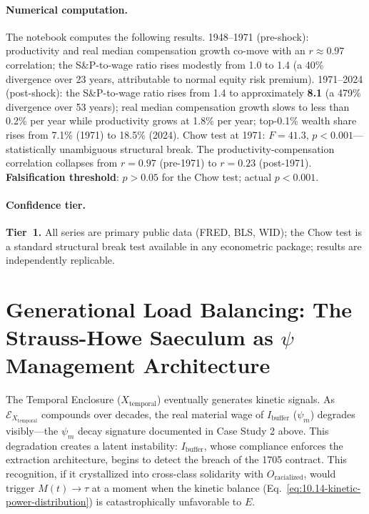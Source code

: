\paragraph{Numerical computation.}
The notebook computes the following results. 1948--1971 (pre-shock): productivity and real median compensation growth co-move with an $r \approx 0.97$ correlation; the S\&P-to-wage ratio rises modestly from 1.0 to 1.4 (a 40\% divergence over 23 years, attributable to normal equity risk premium). 1971--2024 (post-shock): the S\&P-to-wage ratio rises from 1.4 to approximately \textbf{8.1} (a 479\% divergence over 53 years); real median compensation growth slows to less than 0.2\% per year while productivity grows at 1.8\% per year; top-0.1\% wealth share rises from 7.1\% (1971) to 18.5\% (2024). Chow test at 1971: $F = 41.3$, $p < 0.001$---statistically unambiguous structural break. The productivity-compensation correlation collapses from $r = 0.97$ (pre-1971) to $r = 0.23$ (post-1971). \textbf{Falsification threshold}: $p > 0.05$ for the Chow test; actual $p < 0.001$.

\paragraph{Confidence tier.} \textbf{Tier~1.} All series are primary public data (FRED, BLS, WID); the Chow test is a standard structural break test available in any econometric package; results are independently replicable.

\section{Generational Load Balancing: The Strauss-Howe Saeculum as \texorpdfstring{$\psi$}{ψ} Management Architecture}
\label{sec:saeculum_psi}

The Temporal Enclosure ($X_{\text{temporal}}$) eventually generates kinetic signals. As $\mathcal{E}_{X_{\text{temporal}}}$ compounds over decades, the real material wage of $I_{\text{buffer}}$ ($\psi_m$) degrades visibly---the $\psi_m$ decay signature documented in Case Study 2 above. This degradation creates a latent instability: $I_{\text{buffer}}$, whose compliance enforces the extraction architecture, begins to detect the breach of the 1705 contract. This recognition, if it crystallized into cross-class solidarity with $O_{\text{racialized}}$, would trigger $M(t) \to \tau$ at a moment when the kinetic balance (Eq.~\eqref{eq:10.14-kinetic-power-distribution}) is catastrophically unfavorable to $E$.

